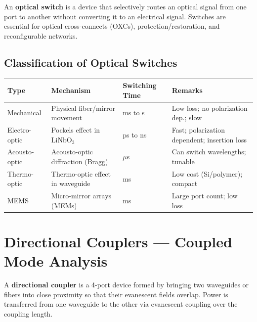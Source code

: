 \documentclass[12pt,a4paper]{article}
\renewcommand{\arraystretch}{1.45}
\begin{document}
\begin{tcolorbox}[defbox, title={\textbf{Optical Switch}}]
An \textbf{optical switch} is a device that selectively routes an optical signal from one port to another without converting it to an electrical signal. Switches are essential for optical cross-connects (OXCs), protection/restoration, and reconfigurable networks.
\end{tcolorbox}

\subsection{Classification of Optical Switches}
\par\noindent
{\renewcommand{\arraystretch}{1.55}
\begin{tabularx}{\linewidth}{|B{3.0cm}|Y|Y|Y|}
\hline
\textbf{Type} & \textbf{Mechanism} & \textbf{Switching Time} & \textbf{Remarks} \\
\hline
Mechanical & Physical fiber/mirror movement & ms to s & Low loss; no polarization dep.; slow \\
\hline
Electro-optic & Pockels effect in LiNbO$_3$ & ps to ns & Fast; polarization dependent; insertion loss \\
\hline
Acousto-optic & Acousto-optic diffraction (Bragg) & $\mu$s & Can switch wavelengths; tunable \\
\hline
Thermo-optic & Thermo-optic effect in waveguide & ms & Low cost (Si/polymer); compact \\
\hline
MEMS & Micro-mirror arrays (MEMs) & ms & Large port count; low loss \\
\hline
\end{tabularx}}

\section{Directional Couplers --- Coupled Mode Analysis}

\begin{tcolorbox}[defbox, title={\textbf{Directional Coupler}}]
A \textbf{directional coupler} is a 4-port device formed by bringing two waveguides or fibers into close proximity so that their evanescent fields overlap. Power is transferred from one waveguide to the other via evanescent coupling over the coupling length.
\end{tcolorbox}
\end{document}
